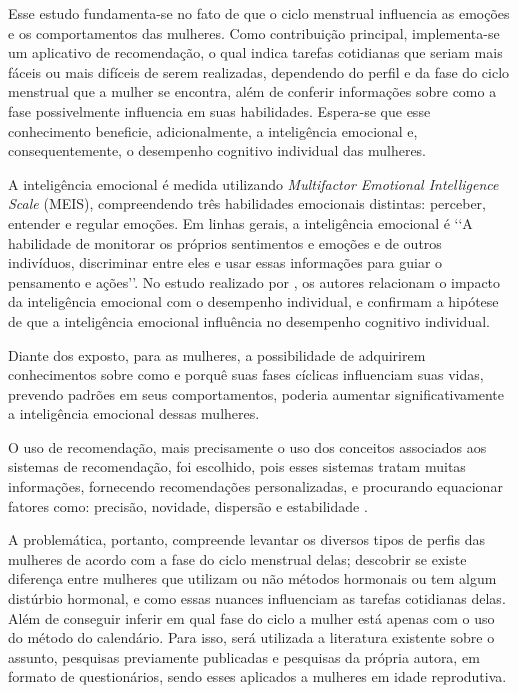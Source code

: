 Esse estudo fundamenta-se no fato de que o ciclo menstrual influencia as emoções e os comportamentos 
das mulheres. Como contribuição principal, implementa-se um aplicativo de recomendação, o qual 
indica tarefas cotidianas que seriam mais fáceis ou mais difíceis de serem realizadas, dependendo do 
perfil e da fase do ciclo menstrual que a mulher se encontra, além de conferir informações sobre como 
a fase possivelmente influencia em suas habilidades. Espera-se que esse conhecimento beneficie, 
adicionalmente, a inteligência emocional e, consequentemente, o desempenho cognitivo individual das 
mulheres. 

A inteligência emocional é medida utilizando \textit{Multifactor Emotional Intelligence Scale} (MEIS), 
compreendendo três habilidades emocionais distintas: perceber, entender e regular emoções. Em linhas 
gerais, a inteligência 
emocional é \lq \lq A habilidade de monitorar os próprios sentimentos e emoções e de outros indivíduos, 
discriminar entre eles e usar essas informações para guiar o pensamento e ações\rq \rq \cite{salovey1990}. 
No estudo realizado por , os autores relacionam o impacto da inteligência emocional 
com o desempenho individual, e confirmam a hipótese de 
que a inteligência emocional influência no desempenho cognitivo individual. 

Diante dos exposto, para as mulheres, 
a possibilidade de adquirirem conhecimentos sobre como e porquê suas fases cíclicas influenciam suas vidas, 
prevendo padrões em seus comportamentos, poderia aumentar 
significativamente a inteligência emocional dessas mulheres. 


O uso de recomendação, mais precisamente o uso dos conceitos associados aos sistemas de recomendação, 
foi escolhido, pois esses sistemas tratam muitas informações, fornecendo recomendações personalizadas, 
e procurando equacionar fatores como: precisão, novidade, dispersão e estabilidade \cite{bobadilla2013}.


A problemática, portanto, compreende levantar os diversos tipos de perfis das mulheres de acordo com a 
fase do ciclo menstrual delas; descobrir se existe diferença entre mulheres que utilizam ou não métodos 
hormonais ou tem algum distúrbio hormonal, e como essas nuances influenciam as tarefas cotidianas delas. 
Além de conseguir inferir em qual fase do ciclo a mulher está apenas com o uso do método do calendário. 
Para isso, será utilizada a literatura existente sobre o assunto, pesquisas previamente publicadas e 
pesquisas da própria autora, em formato de questionários, sendo esses aplicados a mulheres em idade 
reprodutiva.


